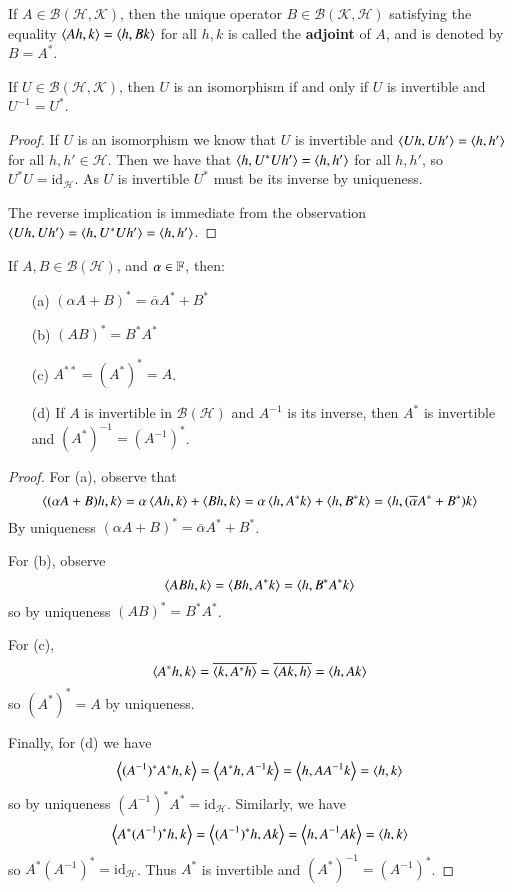 \begin{defn}
    If $A \in \mathscr{B}(\mathscr{H},\mathscr{K})$, then the unique operator $B \in \mathscr{B}(\mathscr{K},\mathscr{H})$ satisfying the equality $\left\langle Ah, k\right\rangle = \left\langle h, Bk\right\rangle$ for all $h,k$ is called the \textbf{adjoint} of $A$, and is denoted by $B = A^*$.
\end{defn}

\begin{prop}
    If $U \in \mathscr{B}(\mathscr{H},\mathscr{K})$, then $U$ is an isomorphism if and only if $U$ is invertible and $U^{-1} = U^*$.
\end{prop}
\begin{proof}
     If $U$ is an isomorphism we know that $U$ is invertible and $\left\langle Uh, Uh'\right\rangle = \left\langle h, h'\right\rangle$ for all $h,h' \in \mathscr{H}$. Then we have that $\left\langle h, U^*Uh'\right\rangle = \left\langle h, h'\right\rangle$ for all $h,h'$, so $U^*U = \text{id}_{\mathscr{H}}$. As $U$ is invertible $U^*$ must be its inverse by uniqueness.

     The reverse implication is immediate from the observation $\left\langle Uh, Uh'\right\rangle = \left\langle h, U^*Uh'\right\rangle = \left\langle h, h'\right\rangle$.
\end{proof}


\begin{prop}
    If $A,B \in \mathscr{B}(\mathscr{H})$, and $\alpha \in \mathbb F$, then: \begin{enumerate}
        \item[(a)] $(\alpha A+B)^* = \overline{\alpha}A^*+B^*$
        \item[(b)] $(AB)^* = B^*A^*$
        \item[(c)] $A^{**} = (A^*)^* = A$.
        \item[(d)] If $A$ is invertible in $\mathscr{B}(\mathscr{H})$ and $A^{-1}$ is its inverse, then $A^*$ is invertible and $(A^*)^{-1} = (A^{-1})^*$.
    \end{enumerate}
\end{prop}
\begin{proof}
    For (a), observe that $$\left\langle (\alpha A+B)h, k\right\rangle = \alpha \left\langle Ah, k\right\rangle+\left\langle Bh, k\right\rangle = \alpha \left\langle h, A^*k\right\rangle + \left\langle h, B^*k\right\rangle = \left\langle h, (\overline{\alpha}A^*+B^*)k\right\rangle$$
    By uniqueness $(\alpha A+B)^* = \overline{\alpha}A^*+B^*$.

    For (b), observe $$\left\langle ABh, k\right\rangle = \left\langle Bh, A^*k\right\rangle = \left\langle h, B^*A^*k\right\rangle$$
    so by uniqueness $(AB)^* = B^*A^*$.

    For (c), $$\left\langle A^*h, k\right\rangle = \overline{\left\langle k, A^*h\right\rangle} = \overline{\left\langle Ak, h\right\rangle} = \left\langle h, Ak\right\rangle$$
    so $(A^*)^* = A$ by uniqueness.

    Finally, for (d) we have $$\left\langle (A^{-1})^*A^*h, k\right\rangle = \left\langle A^*h, A^{-1}k\right\rangle = \left\langle h, AA^{-1}k\right\rangle = \left\langle h, k\right\rangle$$
    so by uniqueness $(A^{-1})^*A^* = \text{id}_{\mathscr{H}}$. Similarly, we have $$\left\langle A^*(A^{-1})^*h, k\right\rangle = \left\langle (A^{-1})^*h, Ak\right\rangle = \left\langle h, A^{-1}Ak\right\rangle = \left\langle h, k\right\rangle$$
    so $A^*(A^{-1})^* = \text{id}_{\mathscr{H}}$. Thus $A^*$ is invertible and $(A^*)^{-1} = (A^{-1})^*$.
\end{proof}

